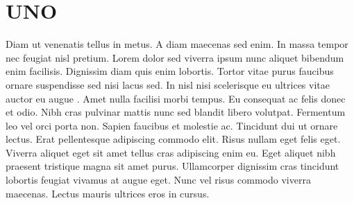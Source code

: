 \section{UNO}
    Diam ut venenatis tellus in metus. A diam maecenas sed enim. In massa tempor nec feugiat nisl pretium. Lorem
    dolor sed viverra ipsum nunc aliquet bibendum enim facilisis. Dignissim diam quis enim lobortis. Tortor vitae
    purus faucibus ornare suspendisse sed nisi lacus sed. In nisl nisi scelerisque eu ultrices vitae auctor eu augue
    . Amet nulla facilisi morbi tempus. Eu consequat ac felis donec et odio. Nibh cras pulvinar mattis nunc sed
    blandit libero volutpat. Fermentum leo vel orci porta non. Sapien faucibus et molestie ac. Tincidunt dui ut
    ornare lectus. Erat pellentesque adipiscing commodo elit. Risus nullam eget felis eget. Viverra aliquet eget sit
    amet tellus cras adipiscing enim eu. Eget aliquet nibh praesent tristique magna sit amet purus. Ullamcorper
    dignissim cras tincidunt lobortis feugiat vivamus at augue eget. Nunc vel risus commodo viverra maecenas. Lectus
    mauris ultrices eros in cursus.